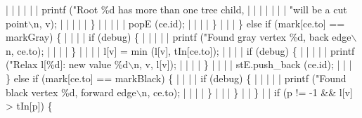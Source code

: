 {{\color[rgb]{0.8,0.8,0.8}| | | | | | }printf ({\color[rgb]{0.5,0.0,0.0}"Root \%d has more than one tree child, \textquotedbl}\newline
{\color[rgb]{0.8,0.8,0.8}| | | | | | | }{\color[rgb]{0.5,0.0,0.0}"will be a cut point$\backslash$n\textquotedbl}, v);\newline
{\color[rgb]{0.8,0.8,0.8}| | | | | }\}\newline
{\color[rgb]{0.8,0.8,0.8}| | | | | }popE (ce.id);\newline
{\color[rgb]{0.8,0.8,0.8}| | | | }\}\newline
{\color[rgb]{0.8,0.8,0.8}| | | }\} {\color[rgb]{0.4,0.4,0.0}else} {\color[rgb]{0.4,0.4,0.0}if} (mark[ce.to] == markGray) \{\newline
{\color[rgb]{0.8,0.8,0.8}| | | | }{\color[rgb]{0.4,0.4,0.0}if} (debug) \{\newline
{\color[rgb]{0.8,0.8,0.8}| | | | | }printf ({\color[rgb]{0.5,0.0,0.0}"Found gray vertex \%d, back edge$\backslash$n\textquotedbl}, ce.to);\newline
{\color[rgb]{0.8,0.8,0.8}| | | | }\}\newline
{\color[rgb]{0.8,0.8,0.8}| | | | }l[v] = min (l[v], tIn[ce.to]);\newline
{\color[rgb]{0.8,0.8,0.8}| | | | }{\color[rgb]{0.4,0.4,0.0}if} (debug) \{\newline
{\color[rgb]{0.8,0.8,0.8}| | | | | }printf ({\color[rgb]{0.5,0.0,0.0}"Relax l[\%d]: new value \%d$\backslash$n\textquotedbl}, v, l[v]);\newline
{\color[rgb]{0.8,0.8,0.8}| | | | }\}\newline
{\color[rgb]{0.8,0.8,0.8}| | | | }stE.push\_back (ce.id);\newline
{\color[rgb]{0.8,0.8,0.8}| | | }\} {\color[rgb]{0.4,0.4,0.0}else} {\color[rgb]{0.4,0.4,0.0}if} (mark[ce.to] == markBlack) \{\newline
{\color[rgb]{0.8,0.8,0.8}| | | | }{\color[rgb]{0.4,0.4,0.0}if} (debug) \{\newline
{\color[rgb]{0.8,0.8,0.8}| | | | | }printf ({\color[rgb]{0.5,0.0,0.0}"Found black vertex \%d, forward edge$\backslash$n\textquotedbl}, ce.to);\newline
{\color[rgb]{0.8,0.8,0.8}| | | | }\}\newline
{\color[rgb]{0.8,0.8,0.8}| | | }\}\newline
{\color[rgb]{0.8,0.8,0.8}| | }\}\newline
{\color[rgb]{0.8,0.8,0.8}}\newline
{\color[rgb]{0.8,0.8,0.8}| | }{\color[rgb]{0.4,0.4,0.0}if} (p != {-}{\color[rgb]{0.0,0.0,0.5}1} \&\& l[v] >{} tIn[p]) \{\newline
}
